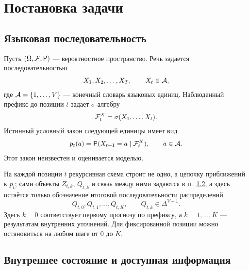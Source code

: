 \section{Постановка задачи}

\subsection{Языковая последовательность}

Пусть \((\Omega,\mathcal{F},\mathsf{P})\) --- вероятностное пространство. Речь задается последовательностью
\begin{equation}
  X_1,X_2,\ldots,X_T, \qquad X_t\in\mathcal{A},
  \label{eq:language_sequence}
\end{equation}
где \(\mathcal{A}=\{1,\ldots,V\}\) --- конечный словарь языковых единиц. Наблюденный префикс до позиции
\(t\) задает \(\sigma\)-алгебру
\begin{equation}
  \mathcal{F}^X_t=\sigma(X_1,\ldots,X_t).
\end{equation}
Истинный условный закон следующей единицы имеет вид
\begin{equation}
  p_t(a)=\mathsf{P}(X_{t+1}=a\mid \mathcal{F}^X_t), \qquad a\in\mathcal{A}.
  \label{eq:true_language_law}
\end{equation}
Этот закон неизвестен и оценивается моделью.

На каждой позиции \(t\) рекурсивная схема строит не одно, а цепочку приближений к \(p_t\); сами
объекты \(Z_{t,k}\), \(Q_{t,k}\) и связь между ними задаются в п.~\ref{sec:recursive_process}, а
здесь остаётся только обозначение итоговой последовательности распределений
\begin{equation}
  Q_{t,0},Q_{t,1},\ldots,Q_{t,K}, \qquad Q_{t,k}\in\Delta^{V-1}.
  \label{eq:recursive_predictions}
\end{equation}
Здесь \(k=0\) соответствует первому прогнозу по префиксу, а \(k=1,\ldots,K\) --- результатам
внутренних уточнений. Для фиксированной позиции можно остановиться на любом шаге от \(0\) до \(K\).

\subsection{Внутреннее состояние и доступная информация}\label{sec:recursive_process}

